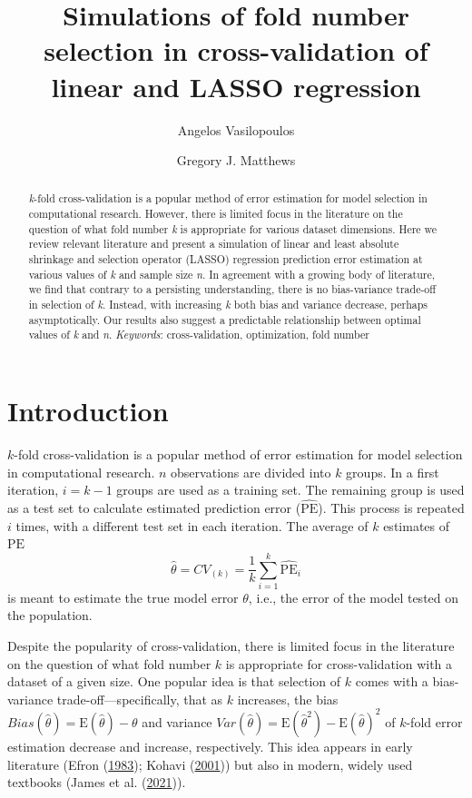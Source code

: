 \documentclass[
  12pt,
]{article}
\title{Simulations of fold number selection in cross-validation of
linear and LASSO regression}
\author{Angelos Vasilopoulos \and Gregory J. Matthews}
\date{}
\begin{document}
\maketitle
\begin{abstract}
\emph{k}-fold cross-validation is a popular method of error estimation
for model selection in computational research. However, there is limited
focus in the literature on the question of what fold number \emph{k} is
appropriate for various dataset dimensions. Here we review relevant
literature and present a simulation of linear and least absolute
shrinkage and selection operator (LASSO) regression prediction error
estimation at various values of \emph{k} and sample size \emph{n}. In
agreement with a growing body of literature, we find that contrary to a
persisting understanding, there is no bias-variance trade-off in
selection of \emph{k}. Instead, with increasing \emph{k} both bias and
variance decrease, perhaps asymptotically. Our results also suggest a
predictable relationship between optimal values of \emph{k} and
\emph{n}. \textbar{} \emph{Keywords}: cross-validation, optimization,
fold number
\end{abstract}

\hypertarget{sec:intro}{%
\section{Introduction}\label{sec:intro}}

\(k\)-fold cross-validation is a popular method of error estimation for
model selection in computational research. \(n\) observations are
divided into \(k\) groups. In a first iteration, \(i = k - 1\) groups
are used as a training set. The remaining group is used as a test set to
calculate estimated prediction error (\(\mathrm{\widehat{PE}}\)). This
process is repeated \(i\) times, with a different test set in each
iteration. The average of \(k\) estimates of \(\mathrm{PE}\)
\[\hat{\theta} = CV_{(k)} = \frac{1}{k}\sum_{i=1}^{k}\mathrm{\widehat{PE}}_i\]
is meant to estimate the true model error \(\theta\), i.e., the error of
the model tested on the population.

Despite the popularity of cross-validation, there is limited focus in
the literature on the question of what fold number \(k\) is appropriate
for cross-validation with a dataset of a given size. One popular idea is
that selection of \(k\) comes with a bias-variance
trade-off---specifically, that as \(k\) increases, the bias
\(Bias(\hat{\theta}) = \mathrm{E}(\hat{\theta}) - \theta\) and variance
\(Var(\hat{\theta}) = \mathrm{E}(\hat{\theta}^2) - \mathrm{E}(\hat{\theta})^2\)
of \(k\)-fold error estimation decrease and increase, respectively. This
idea appears in early literature (Efron
(\protect\hyperlink{ref-Efron1983}{1983}); Kohavi
(\protect\hyperlink{ref-Kohavi2001}{2001})) but also in modern, widely
used textbooks (James et al. (\protect\hyperlink{ref-James2021}{2021})).
\end{document}
